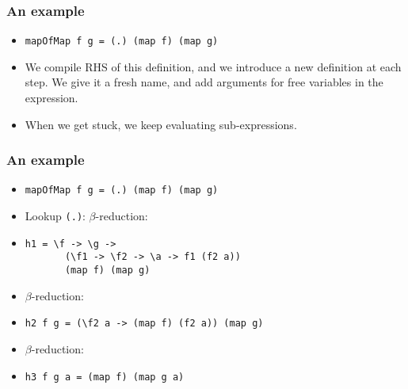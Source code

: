 \documentclass{beamer}
\begin{document}
\begin{frame}[fragile]

    \frametitle{An example}

    \begin{itemize}[<+->]
        \item[]
            \begin{verbatim}
mapOfMap f g = (.) (map f) (map g)
            \end{verbatim}

        \item[]
            We compile RHS of this definition, and we introduce a new definition
            at each step. We give it a fresh name, and add arguments for free
            variables in the expression.

        \item[]
            When we get stuck, we keep evaluating sub-expressions.

    \end{itemize}

\end{frame}

\begin{frame}[fragile]

    \frametitle{An example}

    \begin{itemize}[<+->]

        \item[]
            \begin{verbatim}
mapOfMap f g = (.) (map f) (map g)
            \end{verbatim}

        \item[]
            Lookup \texttt{(.)}:
            $\beta$-reduction:

        \item[]
            \begin{verbatim}
h1 = \f -> \g ->
       (\f1 -> \f2 -> \a -> f1 (f2 a))
       (map f) (map g)
            \end{verbatim}

        \item[]
            $\beta$-reduction:

        \item[]
            \begin{verbatim}
h2 f g = (\f2 a -> (map f) (f2 a)) (map g)
            \end{verbatim}

        \item[]
            $\beta$-reduction:

        \item[]
            \begin{verbatim}
h3 f g a = (map f) (map g a)
            \end{verbatim}

    \end{itemize}

\end{frame}
\end{document}
